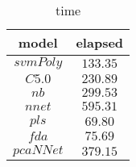 \begin{table}[!ht]
	\centering
	\begin{tabular}{|c|c|}
		\hline
		model & elapsed \\ \hline
		$svmPoly$ & $133.35$ \\ \hline
		$C5.0$ & $230.89$ \\ \hline
		$nb$ & $299.53$ \\ \hline
		$nnet$ & $595.31$ \\ \hline
		$pls$ & $69.80$ \\ \hline
		$fda$ & $75.69$ \\ \hline
		$pcaNNet$ & $379.15$ \\ \hline
	\end{tabular}
	\caption{time}
	\label{tab:time}
\end{table}
